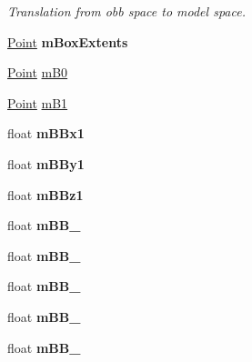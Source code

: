 \begin{DoxyCompactItemize}
\begin{DoxyCompactList}\small\item\em Translation from obb space to model space. \end{DoxyCompactList}\item 
\hypertarget{class_o_b_b_collider_a85cf33fc7c9905f3eb92f50d8c5e85ee}{\hyperlink{class_point}{Point} {\bfseries m\+Box\+Extents}}\label{class_o_b_b_collider_a85cf33fc7c9905f3eb92f50d8c5e85ee}

\item 
\hyperlink{class_point}{Point} \hyperlink{class_o_b_b_collider_ababfe89f659ab27311d469a5df6f0549}{m\+B0}
\item 
\hyperlink{class_point}{Point} \hyperlink{class_o_b_b_collider_a465c36ae12538e771dd86148e2ce595d}{m\+B1}
\item 
\hypertarget{class_o_b_b_collider_a5b9422d324719a2d111012eb774d417a}{float {\bfseries m\+B\+Bx1}}\label{class_o_b_b_collider_a5b9422d324719a2d111012eb774d417a}

\item 
\hypertarget{class_o_b_b_collider_a99be976cae0cdb329ecbbc55b71a1708}{float {\bfseries m\+B\+By1}}\label{class_o_b_b_collider_a99be976cae0cdb329ecbbc55b71a1708}

\item 
\hypertarget{class_o_b_b_collider_acf538636f3f399f017abd44bef2bd40c}{float {\bfseries m\+B\+Bz1}}\label{class_o_b_b_collider_acf538636f3f399f017abd44bef2bd40c}

\item 
\hypertarget{class_o_b_b_collider_ab3bbbd2d415083919b4c5f346e19837d}{float {\bfseries m\+B\+B\+\_}}\label{class_o_b_b_collider_ab3bbbd2d415083919b4c5f346e19837d}

\item 
\hypertarget{class_o_b_b_collider_a22da5eeed48b4cc2380972a959cb2abc}{float {\bfseries m\+B\+B\+\_}}\label{class_o_b_b_collider_a22da5eeed48b4cc2380972a959cb2abc}

\item 
\hypertarget{class_o_b_b_collider_ab34c62840fc63a5c3d98714d6b460f19}{float {\bfseries m\+B\+B\+\_}}\label{class_o_b_b_collider_ab34c62840fc63a5c3d98714d6b460f19}

\item 
\hypertarget{class_o_b_b_collider_a372957c5d34150815500851c2dde6e7c}{float {\bfseries m\+B\+B\+\_}}\label{class_o_b_b_collider_a372957c5d34150815500851c2dde6e7c}

\item 
\hypertarget{class_o_b_b_collider_aae145764ee071112cd9bd7528c40a60d}{float {\bfseries m\+B\+B\+\_}}\label{class_o_b_b_collider_aae145764ee071112cd9bd7528c40a60d}


\end{DoxyCompactItemize}
